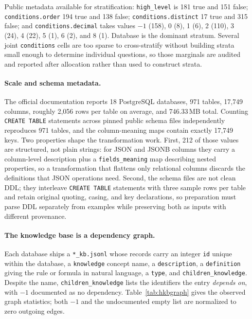 Public metadata available for stratification: \texttt{high\_level} is 181 true
and 151 false; \texttt{conditions.order} 194 true and 138 false;
\texttt{conditions.distinct} 17 true and 315 false; and
\texttt{conditions.decimal} takes values $-1$ (158), 0 (8), 1 (6), 2 (110), 3
(24), 4 (22), 5 (1), 6 (2), and 8 (1). Database is the dominant stratum. Several
joint \texttt{conditions} cells are too sparse to cross-stratify without building
strata small enough to determine individual questions, so those marginals are
audited and reported after allocation rather than used to construct strata.

\paragraph{Scale and schema metadata.}
The official documentation reports 18 PostgreSQL databases, 971 tables, 17,749
columns, roughly 2,056 rows per table on average, and 746.33\,MB total. Counting
\texttt{CREATE TABLE} statements across pinned public schema files independently
reproduces 971 tables, and the column-meaning maps contain exactly 17,749 keys.
Two properties shape the transformation work. First, 212 of those values are
structured, not plain strings: for JSON and JSONB columns they carry a
column-level description plus a \texttt{fields\_meaning} map describing nested
properties, so a transformation that flattens only relational columns discards
the definitions that JSON operations need. Second, the schema files are not clean
DDL; they interleave \texttt{CREATE TABLE} statements with three sample rows per
table and retain original quoting, casing, and key declarations, so preparation
must parse DDL separately from examples while preserving both as inputs with
different provenance.

\paragraph{The knowledge base is a dependency graph.}
Each database ships a \texttt{*\_kb.jsonl} whose records carry an integer
\texttt{id} unique within the database, a \texttt{knowledge} concept name, a
\texttt{description}, a \texttt{definition} giving the rule or formula in natural
language, a \texttt{type}, and \texttt{children\_knowledge}. Despite the name,
\texttt{children\_knowledge} lists the identifiers the entry \emph{depends on},
with $-1$ documented as no dependency. Table~\ref{tab:hkbgraph} gives the observed
graph statistics; both $-1$ and the undocumented empty list are normalized to
zero outgoing edges.

